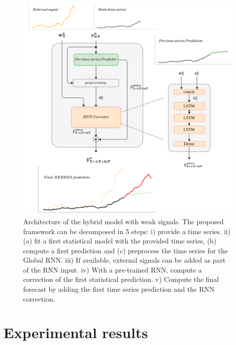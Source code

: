 \documentclass[10pt]{article} %
\begin{document}
\begin{figure}
  \centering
    \includegraphics[width=1\linewidth]{paper_final_framework.png}
  \caption{Architecture of the hybrid model with weak signals. The proposed framework can be decomposed in 5 steps: i) provide a time series. ii) (a) fit a first statistical model with the provided time series, (b) compute a first prediction and (c) preprocess the time series for the Global RNN. iii) If available, external signals can be added as part of the RNN input. iv) With a pre-trained RNN, compute a correction of the first statistical prediction. v) Compute the final forecast by adding the first time series prediction and the RNN correction.} 
\label{fig:architecture}
\end{figure}


\section{Experimental results}
\label{sec:exp}
\end{document}
